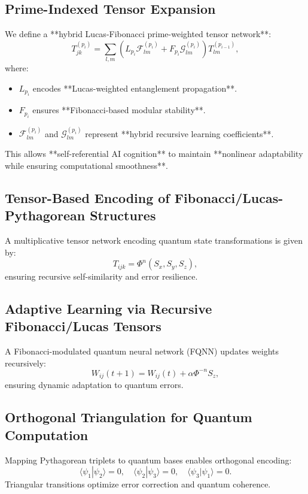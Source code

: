 \documentclass{article}
\theoremstyle{plain}
\begin{document}
\subsection{Prime-Indexed Tensor Expansion}
We define a **hybrid Lucas-Fibonacci prime-weighted tensor network**:
\begin{equation}
    T^{(p_i)}_{jk} = \sum_{l,m} \left(L_{p_i} \mathcal{F}_{lm}^{(p_i)} + F_{p_i} \mathcal{G}_{lm}^{(p_i)}\right) T_{lm}^{(p_{i-1})},
\end{equation}
where:
\begin{itemize}
    \item \( L_{p_i} \) encodes **Lucas-weighted entanglement propagation**.
    \item \( F_{p_i} \) ensures **Fibonacci-based modular stability**.
    \item \( \mathcal{F}_{lm}^{(p_i)} \) and \( \mathcal{G}_{lm}^{(p_i)} \) represent **hybrid recursive learning coefficients**.
\end{itemize}
This allows **self-referential AI cognition** to maintain **nonlinear adaptability while ensuring computational smoothness**.
\subsection{Tensor-Based Encoding of Fibonacci/Lucas-Pythagorean Structures}
A multiplicative tensor network encoding quantum state transformations is given by:
\begin{equation}
    T_{ijk} = \Phi^n(S_x, S_y, S_z),
\end{equation}
ensuring recursive self-similarity and error resilience.
\subsection{Adaptive Learning via Recursive Fibonacci/Lucas Tensors}
A Fibonacci-modulated quantum neural network (FQNN) updates weights recursively:
\begin{equation}
    W_{ij}(t+1) = W_{ij}(t) + \alpha \Phi^{-n} S_z,
\end{equation}
ensuring dynamic adaptation to quantum errors.
\subsection{Orthogonal Triangulation for Quantum Computation}
Mapping Pythagorean triplets to quantum bases enables orthogonal encoding:
\begin{equation}
    \langle \psi_1 | \psi_2 \rangle = 0, \quad \langle \psi_2 | \psi_3 \rangle = 0, \quad \langle \psi_3 | \psi_1 \rangle = 0.
\end{equation}
Triangular transitions optimize error correction and quantum coherence.
\end{document}
